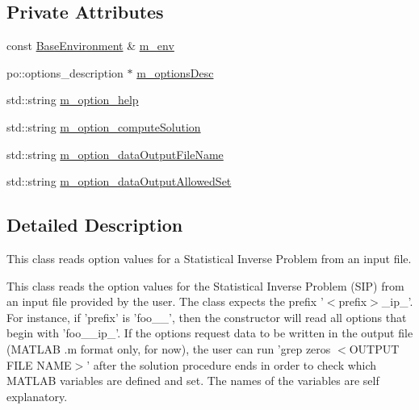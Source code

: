 \subsection*{Private Attributes}
\begin{DoxyCompactItemize}
\item 
const \hyperlink{class_q_u_e_s_o_1_1_base_environment}{Base\-Environment} \& \hyperlink{class_q_u_e_s_o_1_1_statistical_inverse_problem_options_afce40a7fed3b00fc8cabad7ff81ef35f}{m\-\_\-env}
\item 
po\-::options\-\_\-description $\ast$ \hyperlink{class_q_u_e_s_o_1_1_statistical_inverse_problem_options_ac7b8dad567ffef98d5a98061a7d631ea}{m\-\_\-options\-Desc}
\item 
std\-::string \hyperlink{class_q_u_e_s_o_1_1_statistical_inverse_problem_options_a6442fa5141155733851550abf54fb727}{m\-\_\-option\-\_\-help}
\item 
std\-::string \hyperlink{class_q_u_e_s_o_1_1_statistical_inverse_problem_options_ab6eeb26f8464cd104a9352774027aa7b}{m\-\_\-option\-\_\-compute\-Solution}
\item 
std\-::string \hyperlink{class_q_u_e_s_o_1_1_statistical_inverse_problem_options_af1d009496381139b51679b891fc052f8}{m\-\_\-option\-\_\-data\-Output\-File\-Name}
\item 
std\-::string \hyperlink{class_q_u_e_s_o_1_1_statistical_inverse_problem_options_ac88a78b03e97a655819b039ed6068bbd}{m\-\_\-option\-\_\-data\-Output\-Allowed\-Set}
\end{DoxyCompactItemize}


\subsection{Detailed Description}
This class reads option values for a Statistical Inverse Problem from an input file. 

This class reads the option values for the Statistical Inverse Problem (S\-I\-P) from an input file provided by the user. The class expects the prefix '$<$prefix$>$\-\_\-ip\-\_\-'. For instance, if 'prefix' is 'foo\-\_\-\_\-', then the constructor will read all options that begin with 'foo\-\_\-\_\-ip\-\_\-'. If the options request data to be written in the output file (M\-A\-T\-L\-A\-B .m format only, for now), the user can run 'grep zeros $<$O\-U\-T\-P\-U\-T F\-I\-L\-E N\-A\-M\-E$>$' after the solution procedure ends in order to check which M\-A\-T\-L\-A\-B variables are defined and set. The names of the variables are self explanatory. 

